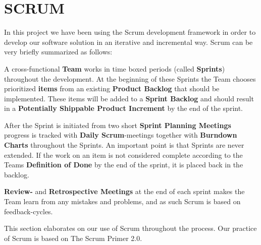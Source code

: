 \section{SCRUM}

In this project we have been using the Scrum development framework in order to develop our software solution in an iterative and incremental way. Scrum can be very briefly summarized as follows:

A cross-functional \textbf{Team} works in time boxed periods (called \textbf{Sprints}) throughout the development. At the beginning of these Sprints the Team chooses prioritized \textbf{items} from an existing \textbf{Product Backlog} that should be implemented. These items will be added to a \textbf{Sprint Backlog} and should result in a \textbf{ Potentially Shippable Product Increment} by the end of the sprint.

After the Sprint is initiated from two short \textbf{Sprint Planning Meetings} progress is tracked with \textbf{Daily Scrum}-meetings together with \textbf{Burndown Charts} throughout the Sprints. An important point is that Sprints are never extended. If the work on an item is not considered complete according to the Teams \textbf{Definition of Done} by the end of the sprint, it is placed back in the backlog.

\textbf{Review-} and \textbf{Retrospective Meetings} at the end of each sprint makes the Team learn from any mistakes and problems, and as such Scrum is based on feedback-cycles.

This section elaborates on our use of Scrum throughout the process. Our practice of Scrum is based on The Scrum Primer 2.0\cite{ScrumPrimer2}.








